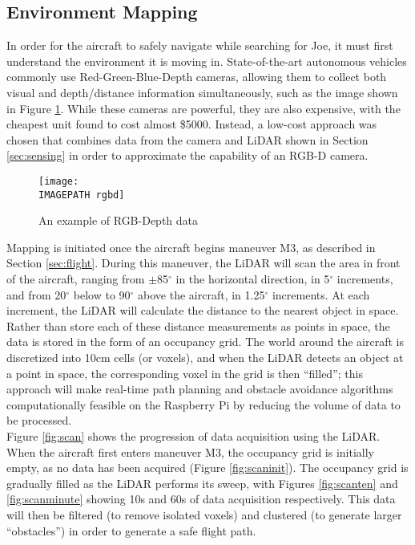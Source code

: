 \subsection{Environment Mapping}
In order for the aircraft to safely navigate while searching for Joe, it must first understand the environment it is moving in. State-of-the-art autonomous vehicles commonly use Red-Green-Blue-Depth cameras\cite{ref:rgbd}, allowing them to collect both visual and depth/distance information simultaneously, such as the image shown in Figure \ref{fig:rgbd}. While these cameras are powerful, they are also expensive, with the cheapest unit found to cost almost \$5000\cite{ref:rgbdcost}. Instead, a low-cost approach was chosen that combines data from the camera and LiDAR shown in Section \ref{sec:sensing} in order to approximate the capability of an RGB-D camera.\\

\begin{figure}[!ht]
	\centering
	\texttt{[image: \\IMAGEPATH rgbd]}
	\caption{An example of RGB-Depth data}
	\label{fig:rgbd}
\end{figure}

Mapping is initiated once the aircraft begins maneuver M3, as described in Section \ref{sec:flight}. During this maneuver, the LiDAR will scan the area in front of the aircraft, ranging from $\pm$85$^\circ$ in the horizontal direction, in 5$^\circ$ increments, and from 20$^\circ$ below to 90$^\circ$ above the aircraft, in 1.25$^\circ$ increments. At each increment, the LiDAR will calculate the distance to the nearest object in space.\\

Rather than store each of these distance measurements as points in space, the data is stored in the form of an occupancy grid. The world around the aircraft is discretized into 10cm cells (or voxels), and when the LiDAR detects an object at a point in space, the corresponding voxel in the grid is then ``filled''; this approach will make real-time path planning and obstacle avoidance algorithms computationally feasible on the Raspberry Pi by reducing the volume of data to be processed.\\

Figure \ref{fig:scan} shows the progression of data acquisition using the LiDAR. When the aircraft first enters maneuver M3, the occupancy grid is initially empty, as no data has been acquired (Figure \ref{fig:scaninit}). The occupancy grid is gradually filled as the LiDAR performs its sweep, with Figures \ref{fig:scanten} and \ref{fig:scanminute} showing 10s and 60s of data acquisition respectively. This data will then be filtered (to remove isolated voxels) and clustered (to generate larger ``obstacles'') in order to generate a safe flight path.

